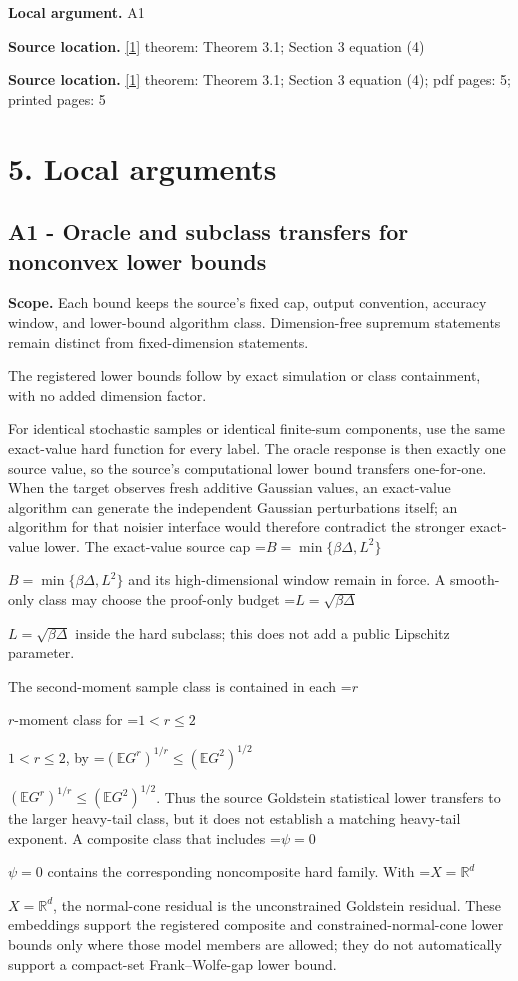 \documentclass[10pt,a4paper]{article}
\newcommand{\AtlasMath}[1]{\par\begingroup\centering\setbox0=\hbox{$\displaystyle #1$}\ifdim\wd0>1.4\linewidth\typeout{ATLAS WIDE FORMULA: \the\wd0}\fi\ifdim\wd0>\linewidth\resizebox{\linewidth}{!}{\box0}\else\box0\fi\par\endgroup}
\newcommand{\AtlasInlineMath}[1]{\begingroup\setbox0=\hbox{$#1$}\ifdim\wd0>.4\linewidth\endgroup\AtlasMath{#1}\else\endgroup$#1$\fi}
\begin{document}
\textbf{Local argument.} A1

\textbf{Source location.} \href{https://arxiv.org/html/2609.00045v3}{[1]} theorem: Theorem 3.1; Section 3 equation (4)

\textbf{Source location.} \href{https://arxiv.org/html/2609.00045v3}{[1]} theorem: Theorem 3.1; Section 3 equation (4); pdf pages: 5; printed pages: 5

\section{5. Local arguments}
\subsection{A1 - Oracle and subclass transfers for nonconvex lower bounds}
\textbf{Scope.} Each bound keeps the source's fixed cap, output convention, accuracy window, and lower-bound algorithm class. Dimension-free supremum statements remain distinct from fixed-dimension statements.

The registered lower bounds follow by exact simulation or class containment, with no added dimension factor.

For identical stochastic samples or identical finite-sum components, use the same exact-value hard function for every label. The oracle response is then exactly one source value, so the source's computational lower bound transfers one-for-one. When the target observes fresh additive Gaussian values, an exact-value algorithm can generate the independent Gaussian perturbations itself; an algorithm for that noisier interface would therefore contradict the stronger exact-value lower. The exact-value source cap \AtlasInlineMath{B=\min\{\beta\Delta,L^2\}} and its high-dimensional window remain in force. A smooth-only class may choose the proof-only budget \AtlasInlineMath{L=\sqrt{\beta\Delta}} inside the hard subclass; this does not add a public Lipschitz parameter.

The second-moment sample class is contained in each \AtlasInlineMath{r}-moment class for \AtlasInlineMath{1<r\le2}, by \AtlasInlineMath{(\mathbb EG^r)^{1/r}\le(\mathbb EG^2)^{1/2}}. Thus the source Goldstein statistical lower transfers to the larger heavy-tail class, but it does not establish a matching heavy-tail exponent. A composite class that includes \AtlasInlineMath{\psi=0} contains the corresponding noncomposite hard family. With \AtlasInlineMath{X=\mathbb R^d}, the normal-cone residual is the unconstrained Goldstein residual. These embeddings support the registered composite and constrained-normal-cone lower bounds only where those model members are allowed; they do not automatically support a compact-set Frank--Wolfe-gap lower bound.
\end{document}
